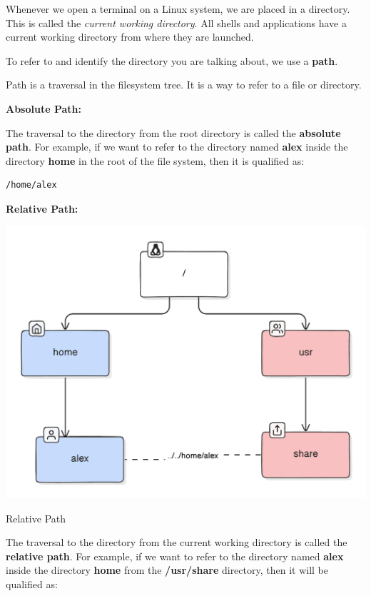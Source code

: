 Whenever we open a terminal on a Linux system, we are placed in a directory.
This is called the \textit{current working directory}.
All shells and applications have a current working directory from where they are launched.

To refer to and identify the directory you are talking about, we use a \textbf{path}.

\begin{definition}[Path]
  Path is a traversal in the filesystem tree.
  It is a way to refer to a file or directory.
\end{definition}

\textbf{Absolute Path:}

The traversal to the directory from the root directory is called the \textbf{absolute path}. For example, if we want to refer to the directory named \textbf{alex} inside the directory \textbf{home} in the root of the file system, then it is qualified as:

\begin{lstlisting}[language=bash]
  /home/alex
\end{lstlisting}

\textbf{Relative Path:}

\begin{marginfigure}
	\includegraphics{images/pdf/relpath.pdf}
	\caption[Relative Path]{Relative Path}
\end{marginfigure}

The traversal to the directory from the current working directory is called the \textbf{relative path}. For example, if we want to refer to the directory named \textbf{alex} inside the directory \textbf{home} from the \textbf{/usr/share} directory, then it will be qualified as:


